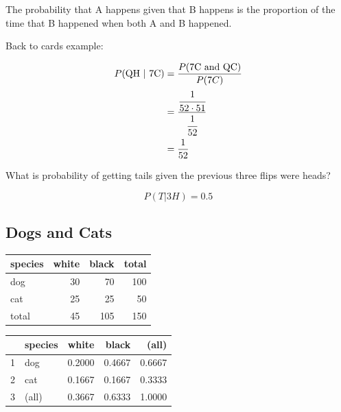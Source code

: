 \documentclass[letterpaper, landscape]{exam}
\begin{document}
  The probability that A happens given that B happens is the proportion of the
  time that B happened when both A and B happened.

  Back to cards example:
  \begin{solution}
    \begin{align*}
    P(\text{QH } | \text{ 7C})  & = \frac{P(\text{7C and QC})}{P(7C)} \\
                                & = \frac{\cfrac{1}{52 \cdot 51}}{\cfrac{1}{52}} \\
                                & = \frac{1}{52} \\
    \end{align*}
  \end{solution}

  What is probability of getting tails given the previous three flips were heads?
  \begin{solution}
    \[
      P(T | 3H) = 0.5
    \]
  \end{solution}

  \subsection{Dogs and Cats}
  \begin{table}[H]
    \begin{tabular}[H]{lrrr}
      \toprule
      species & white & black & total\\
      \midrule
      dog     & 30    & 70    & 100\\
      cat     & 25    & 25    & 50\\
      \midrule
      total   & 45    & 105   & 150\\
      \bottomrule
    \end{tabular}
  \end{table}

  \begin{table}[H]
    \begin{tabular}{rlrrr}
      \toprule
        & species & white  & black  & (all) \\
      \midrule
      1 & dog     & 0.2000 & 0.4667 & 0.6667 \\
      2 & cat     & 0.1667 & 0.1667 & 0.3333 \\
      \midrule
      3 & (all)   & 0.3667 & 0.6333 & 1.0000 \\
      \bottomrule
    \end{tabular}
  \end{table}
\end{document}
